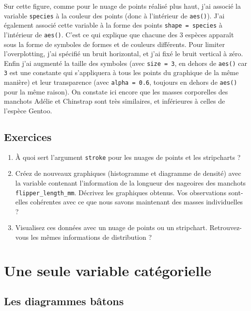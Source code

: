 \documentclass[
  a4paper,
  DIV=11,
  numbers=noendperiod,
  oneside]{scrreprt}
\begin{document}
Sur cette figure, comme pour le nuage de points réalisé plus haut, j'ai
associé la variable \texttt{species} à la couleur des points (donc à
l'intérieur de \texttt{aes()}). J'ai également associé cette variable à
la forme des points \texttt{shape\ =\ species} à l'intérieur de
\texttt{aes()}. C'est ce qui explique que chacune des 3 espèces apparaît
sous la forme de symboles de formes et de couleurs différents. Pour
limiter l'overplotting, j'ai spécifié un bruit horizontal, et j'ai fixé
le bruit vertical à zéro. Enfin j'ai augmenté la taille des symboles
(avec \texttt{size\ =\ 3}, en dehors de \texttt{aes()} car \texttt{3}
est une constante qui s'appliquera à tous les points du graphique de la
même manière) et leur transparence (avec \texttt{alpha\ =\ 0.6},
toujours en dehors de \texttt{aes()} pour la même raison). On constate
ici encore que les masses corporelles des manchots Adélie et Chinstrap
sont très similaires, et inférieures à celles de l'espèce Gentoo.

\subsection{Exercices}\label{sec-exo-4}

\begin{enumerate}
\def\labelenumi{\arabic{enumi}.}
\item
  À quoi sert l'argument \texttt{stroke} pour les nuages de points et
  les stripcharts ?
\item
  Créez de nouveaux graphiques (histogramme et diagramme de densité)
  avec la variable contenant l'information de la longueur des nageoires
  des manchots \texttt{flipper\_length\_mm}. Décrivez les graphiques
  obtenus. Vos observations sont-elles cohérentes avec ce que nous
  savons maintenant des masses individuelles ?
\item
  Visualisez ces données avec un nuage de points ou un stripchart.
  Retrouvez-vous les mêmes informations de distribution ?
\end{enumerate}

\section{Une seule variable
catégorielle}\label{une-seule-variable-catuxe9gorielle}

\subsection{Les diagrammes bâtons}\label{les-diagrammes-buxe2tons}
\end{document}
